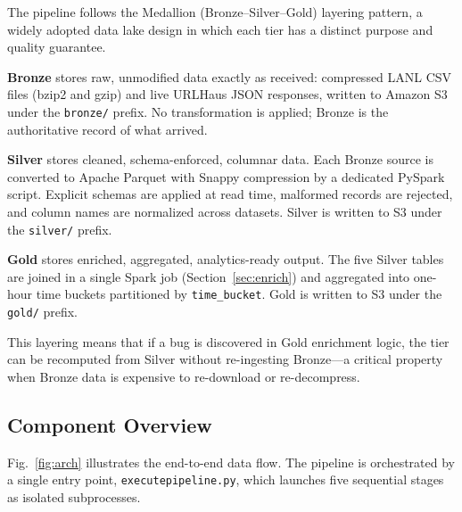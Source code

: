 \documentclass[conference]{IEEEtran}
\begin{document}
The pipeline follows the Medallion (Bronze--Silver--Gold) layering pattern, a widely adopted data lake design in which each tier has a distinct purpose and quality guarantee.

\textbf{Bronze} stores raw, unmodified data exactly as received: compressed LANL CSV files (bzip2 and gzip) and live URLHaus JSON responses, written to Amazon S3 under the \texttt{bronze/} prefix. No transformation is applied; Bronze is the authoritative record of what arrived.

\textbf{Silver} stores cleaned, schema-enforced, columnar data. Each Bronze source is converted to Apache Parquet with Snappy compression by a dedicated PySpark script. Explicit schemas are applied at read time, malformed records are rejected, and column names are normalized across datasets. Silver is written to S3 under the \texttt{silver/} prefix.

\textbf{Gold} stores enriched, aggregated, analytics-ready output. The five Silver tables are joined in a single Spark job (Section~\ref{sec:enrich}) and aggregated into one-hour time buckets partitioned by \texttt{time\_bucket}. Gold is written to S3 under the \texttt{gold/} prefix.

This layering means that if a bug is discovered in Gold enrichment logic, the tier can be recomputed from Silver without re-ingesting Bronze---a critical property when Bronze data is expensive to re-download or re-decompress.

\subsection{Component Overview}

Fig.~\ref{fig:arch} illustrates the end-to-end data flow. The pipeline is orchestrated by a single entry point, \texttt{executepipeline.py}, which launches five sequential stages as isolated subprocesses.
\end{document}
